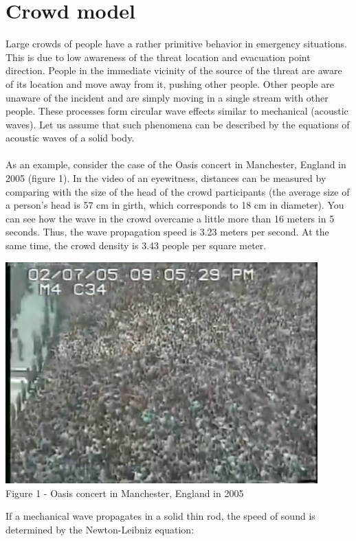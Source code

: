 \documentclass[12pt,a4paper]{report}
\begin{document}
\chapter*{Crowd model}
Large crowds of people have a rather primitive behavior in emergency situations. This is due to low awareness of the threat location and evacuation point direction. People in the immediate vicinity of the source of the threat are aware of its location and move away from it, pushing other people. Other people are unaware of the incident and are simply moving in a single stream with other people. These processes form circular wave effects similar to mechanical (acoustic waves). Let us assume that such phenomena can be described by the equations of acoustic waves of a solid body.\\\\
As an example, consider the case of the Oasis concert in Manchester, England in 2005 (figure 1).  In the video of an eyewitness, distances can be measured by comparing with the size of the head of the crowd participants (the average size of a person's head is 57 cm in girth, which corresponds to 18 cm in diameter). You can see how the wave in the crowd overcame a little more than 16 meters in 5 seconds. Thus, the wave propagation speed is 3.23 meters per second. At the same time, the crowd density is 3.43 people per square meter.\\
\begin{center}
    \includegraphics[width=12cm]{img/srowd.png}\\
    Figure 1 - Oasis concert in Manchester, England in 2005
\end{center}
If a mechanical wave propagates in a solid thin rod, the speed of sound is determined by the Newton-Leibniz equation:
\end{document}
